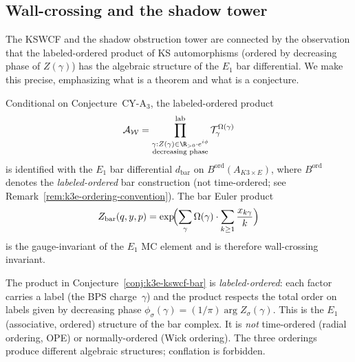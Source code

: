 \subsection{Wall-crossing and the shadow tower}
\label{subsec:k3e-wall-crossing-shadow}

The KSWCF and the shadow obstruction tower are connected by the observation that the labeled-ordered product of KS automorphisms (ordered by decreasing phase of $Z(\gamma)$) has the algebraic structure of the $E_1$ bar differential. We make this precise, emphasizing what is a theorem and what is a conjecture.

\begin{conjecture}
\label{conj:k3e-kswcf-bar}
\ClaimStatusConjectured
Conditional on Conjecture~CY-A$_3$, the labeled-ordered product
\[
 \mathcal{A}_{\mathcal{W}} = \prod_{\substack{\gamma : Z(\gamma) \in \R_{>0} \cdot e^{i\phi} \\ \text{decreasing phase}}}^{\mathrm{lab}} \mathcal{T}_\gamma^{\Omega(\gamma)}
\]
is identified with the $E_1$ bar differential $d_{\mathrm{bar}}$ on $B^{\mathrm{ord}}(A_{K3 \times E})$, where $B^{\mathrm{ord}}$ denotes the \emph{labeled-ordered} bar construction (not time-ordered; see Remark~\ref{rem:k3e-ordering-convention}). The bar Euler product
\[
 Z_{\mathrm{bar}}(q, y, p) = \exp\!\Bigl(\sum_\gamma \Omega(\gamma) \cdot \sum_{k \geq 1} \frac{x_{k\gamma}}{k}\Bigr)
\]
is the gauge-invariant of the $E_1$ MC element and is therefore wall-crossing invariant.
\ClaimStatusConjectured
\end{conjecture}

\begin{remark}
\label{rem:k3e-ordering-convention}
The product in Conjecture~\ref{conj:k3e-kswcf-bar} is \emph{labeled-ordered}: each factor carries a label (the BPS charge~$\gamma$) and the product respects the total order on labels given by decreasing phase $\phi_\sigma(\gamma) = (1/\pi)\arg Z_\sigma(\gamma)$. This is the $E_1$ (associative, ordered) structure of the bar complex. It is \emph{not} time-ordered (radial ordering, OPE) or normally-ordered (Wick ordering). The three orderings produce different algebraic structures; conflation is forbidden.
\end{remark}


